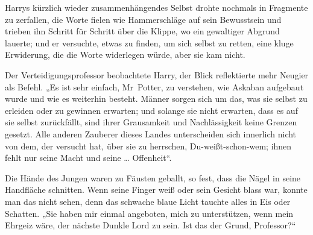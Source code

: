 Harrys kürzlich wieder zusammenhängendes Selbst drohte nochmals in Fragmente zu zerfallen, die Worte fielen wie Hammerschläge auf sein Bewusstsein und trieben ihn Schritt für Schritt über die Klippe, wo ein gewaltiger Abgrund lauerte; und er versuchte, etwas zu finden, um sich selbst zu retten, eine kluge Erwiderung, die die Worte widerlegen würde, aber sie kam nicht.

Der Verteidigungsprofessor beobachtete Harry, der Blick reflektierte mehr Neugier als Befehl.
„Es ist sehr einfach, Mr~Potter, zu verstehen, wie Askaban aufgebaut wurde und wie es weiterhin besteht. Männer sorgen sich um das, was sie selbst zu erleiden oder zu gewinnen erwarten; und solange sie nicht erwarten, dass es auf sie selbst zurückfällt, sind ihrer Grausamkeit und Nachlässigkeit keine Grenzen gesetzt. Alle anderen Zauberer dieses Landes unterscheiden sich innerlich nicht von dem, der versucht hat, über sie zu herrschen, Du-weißt-schon-wem; ihnen fehlt nur seine Macht und seine … Offenheit“.

Die Hände des Jungen waren zu Fäusten geballt, so fest, dass die Nägel in seine Handfläche schnitten. Wenn seine Finger weiß oder sein Gesicht blass war, konnte man das nicht sehen, denn das schwache blaue Licht tauchte alles in Eis oder Schatten.
„Sie haben mir einmal angeboten, mich zu unterstützen, wenn mein Ehrgeiz wäre, der nächste Dunkle Lord zu sein. Ist das der Grund, Professor?“

